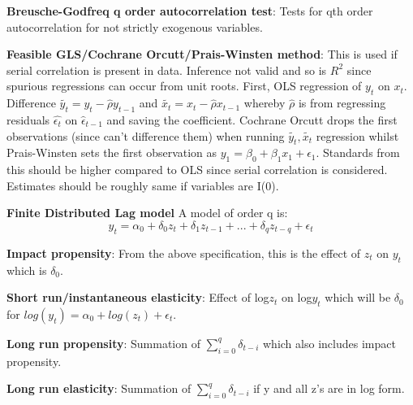 \documentclass[11pt, oneside]{article}
\theoremstyle{definition}
\begin{document}
\textbf{Breusche-Godfreq q order autocorrelation test}: Tests for qth order autocorrelation for not strictly exogenous variables.

\textbf{Feasible GLS/Cochrane Orcutt/Prais-Winsten method}: This is used if serial correlation is present in data. Inference not valid and so is $R^2$ since spurious regressions can occur from unit roots. First, OLS regression of $y_t$ on $x_t$. Difference $\tilde{y_t} = y_t - \hat{\rho} y_{t-1}$ and $\tilde{x_t} = x_t - \hat{\rho} x_{t-1}$ whereby $\hat{\rho}$ is from regressing residuals $\hat{\epsilon_t}$ on $\hat{\epsilon}_{t-1}$ and saving the coefficient. Cochrane Orcutt drops the first observations (since can't difference them) when running $\tilde{y_t}, \tilde{x_t}$ regression whilst Prais-Winsten sets the first observation as $y_1 = \beta_0 + \beta_1x_1 + \epsilon_1$. Standards from this should be higher compared to OLS since serial correlation is considered. Estimates should be roughly same if variables are I(0).

\textbf{Finite Distributed Lag model} A model of order q is:
$$
y_t = \alpha_0 + \delta_0z_t + \delta_1z_{t-1} + ... + \delta_qz_{t-q} + \epsilon_t
$$

\textbf{Impact propensity}: From the above specification, this is the effect of $z_t$ on $y_t$ which is $\delta_0$.

\textbf{Short run/instantaneous elasticity}: Effect of log$z_t$ on log$y_t$ which  will be $\delta_0$ for $log(y_t) = \alpha_0 + log(z_t) + \epsilon_t$.

\textbf{Long run propensity}: Summation of $\sum\limits_{i=0}^{q}\delta_{t-i}$ which also includes impact propensity.

\textbf{Long run elasticity}: Summation of $\sum\limits_{i=0}^{q}\delta_{t-i}$ if y and all z's are in log form.
\end{document}
